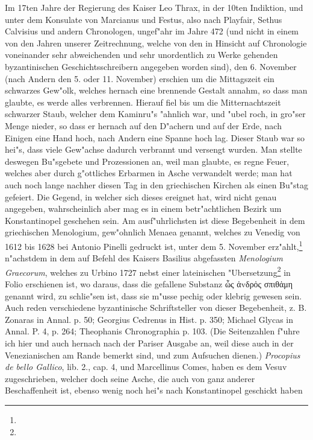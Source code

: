 \documentclass[a4paper, 11pt, oneside, polutonikogreek, german]{article}
\begin{document}
Im 17ten Jahre der Regierung des Kaiser Leo Thrax, in der 10ten Indiktion, und unter dem Konsulate von Marcianus und Festus, also nach Playfair, Sethus Calvisius und andern Chronologen, ungef"ahr im Jahre 472 (und nicht in einem von den Jahren unserer Zeitrechnung, welche von den in Hinsicht auf Chronologie voneinander sehr abweichenden und sehr unordentlich zu Werke gehenden byzantinischen Geschichtsschreibern angegeben worden sind), den 6. November (nach Andern den 5. oder 11. November) erschien um die Mittagszeit ein schwarzes Gew"olk, welches hernach eine brennende Gestalt annahm, so dass man glaubte, es werde alles verbrennen. Hierauf fiel bis um die Mitternachtszeit schwarzer Staub, welcher dem Kaminru"s "ahnlich war, und "ubel roch, in gro"ser Menge nieder, so dass er hernach auf den D"achern und auf der Erde, nach Einigen eine Hand hoch, nach Andern eine Spanne hoch lag. Dieser Staub war so hei"s, dass viele Gew"achse dadurch verbrannt und versengt wurden. Man stellte deswegen Bu"sgebete und Prozessionen an, weil man glaubte, es regne Feuer, welches aber durch g"ottliches Erbarmen in Asche verwandelt werde; man hat auch noch lange nachher diesen Tag in den griechischen Kirchen als einen Bu"stag gefeiert. Die Gegend, in welcher sich dieses ereignet hat, wird nicht genau angegeben, wahrscheinlich aber mag es in einem betr"achtlichen Bezirk um Konstantinopel geschehen sein. Am ausf"uhrlichsten ist diese Begebenheit in dem griechischen Menologium, gew"ohnlich Menaea genannt, welches zu Venedig von 1612 bis 1628 bei Antonio Pinelli gedruckt ist, unter dem 5. November erz"ahlt,\footnote{} n"achstdem in dem auf Befehl des Kaisers Basilius abgefassten \emph{Menologium Graecorum}, welches zu Urbino 1727 nebst einer lateinischen "Ubersetzung\footnote{} in Folio erschienen ist, wo daraus, dass die gefallene Substanz ὧς ἀvδρὀς σπιθἁμη genannt wird, zu schlie"sen ist, dass sie m"usse pechig oder klebrig gewesen sein. Auch reden verschiedene byzantinische Schriftsteller von dieser Begebenheit, z. B. Zonaras in Annal. p. 50; Georgius Cedrenus in Hist. p. 350; Michael Glycas in Annal. P. 4, p. 264; Theophanis Chronographia p. 103. (Die Seitenzahlen f"uhre ich hier und auch hernach nach der Pariser Ausgabe an, weil diese auch in der Venezianischen am Rande bemerkt sind, und zum Aufsuchen dienen.) \emph{Procopius de bello Gallico}, lib. 2., cap. 4, und Marcellinus Comes, haben es dem Vesuv zugeschrieben, welcher doch seine Asche, die auch von ganz anderer Beschaffenheit ist, ebenso wenig noch hei"s nach Konstantinopel geschickt haben 
\end{document}
